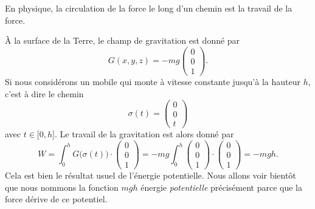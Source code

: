 En physique, la circulation de la force le long d'un chemin est la travail de la force.

\begin{example}
    À la surface de la Terre, le champ de gravitation est donné par
    \begin{equation}
        G(x,y,z)=-mg\begin{pmatrix}
            0    \\ 
            0    \\ 
            1    
        \end{pmatrix}.
    \end{equation}
    Si nous considérons un mobile qui monte à vitesse constante jusqu'à la hauteur $h$, c'est à dire le chemin
    \begin{equation}
        \sigma(t)=\begin{pmatrix}
            0    \\ 
            0    \\ 
            t    
        \end{pmatrix}
    \end{equation}
    avec $t\in\mathopen[ 0 , h \mathclose]$. Le travail de la gravitation est alors donné par
    \begin{equation}
        W=\int_0^hG\big( \sigma(t) \big)\cdot\begin{pmatrix}
            0    \\ 
            0    \\ 
            1    
        \end{pmatrix}=
        -mg\int_0^h\begin{pmatrix}
            0    \\ 
            0    \\ 
            1    
        \end{pmatrix}\cdot\begin{pmatrix}
            0    \\ 
            0    \\ 
            1    
        \end{pmatrix}=-mgh.
    \end{equation}
    Cela est bien le résultat usuel de l'énergie potentielle. Nous allons voir bientôt que nous nommons la fonction $mgh$ énergie \emph{potentielle} précisément parce que la force dérive de ce potentiel.
\end{example}

